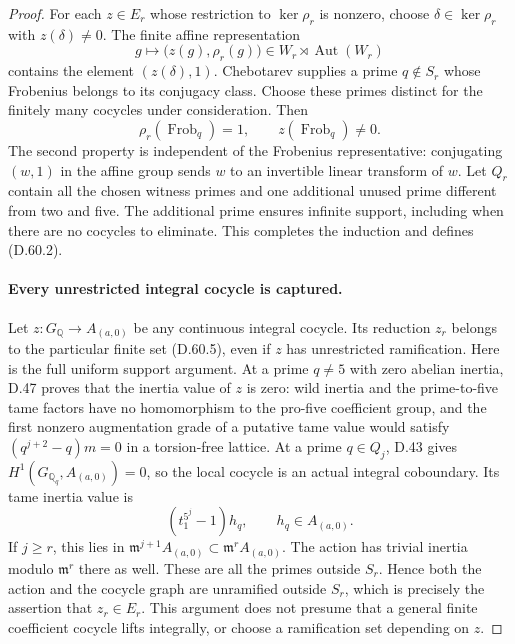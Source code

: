 \begin{proof}
For each \(z\in E_r\) whose restriction to
\(\ker\rho_r\) is nonzero, choose
\(\delta\in\ker\rho_r\) with \(z(\delta)\ne0\).
The finite affine representation
\[
 g\longmapsto\bigl(z(g),\rho_r(g)\bigr)
       \in W_r\rtimes\operatorname{Aut}(W_r)
                                                        \tag{D.60.6}
\]
contains the element \((z(\delta),1)\).
Chebotarev \cite[Chapter V, Theorem 3.23]{PBC_MilneCFT}
supplies a prime \(q\notin S_r\) whose Frobenius
belongs to its conjugacy class. Choose these primes distinct
for the finitely many cocycles under consideration. Then
\[
                 \rho_r(\operatorname{Frob}_q)=1,
                 \qquad z(\operatorname{Frob}_q)\ne0.
                                                        \tag{D.60.7}
\]
The second property is independent of the Frobenius
representative: conjugating \((w,1)\) in the affine group
sends \(w\) to an invertible linear transform of \(w\).
Let \(Q_r\) contain all the chosen witness primes and one
additional unused prime different from two and five. The
additional prime ensures infinite support, including when
there are no cocycles to eliminate. This completes the
induction and defines (D.60.2).

\paragraph{Every unrestricted integral cocycle is captured.}
Let \(z:G_{\mathbb Q}\to A_{(a,0)}\) be any continuous
integral cocycle. Its reduction \(z_r\) belongs to the
particular finite set (D.60.5), even if \(z\) has unrestricted
ramification. Here is the full uniform support argument.
At a prime \(q\ne5\) with zero abelian inertia, D.47 proves
that the inertia value of \(z\) is zero: wild inertia and
the prime-to-five tame factors have no homomorphism to the
pro-five coefficient group, and the first nonzero augmentation
grade of a putative tame value would satisfy
\((q^{j+2}-q)m=0\) in a torsion-free lattice.
At a prime \(q\in Q_j\), D.43 gives
\(H^1(G_{\mathbb Q_q},A_{(a,0)})=0\), so the local cocycle
is an actual integral coboundary. Its tame inertia value is
\[
                        (t_1^{5^j}-1)h_q,
                      \qquad h_q\in A_{(a,0)}.
                                                        \tag{D.60.8}
\]
If \(j\ge r\), this lies in
\(\mathfrak m^{j+1}A_{(a,0)}\subset\mathfrak m^rA_{(a,0)}\).
The action has trivial inertia modulo \(\mathfrak m^r\) there
as well. These are all the primes outside \(S_r\).
Hence both the action and the cocycle graph are unramified
outside \(S_r\), which is precisely the assertion that
\(z_r\in E_r\). This argument does not presume that a
general finite coefficient cocycle lifts integrally, or
choose a ramification set depending on \(z\).


\end{proof}

